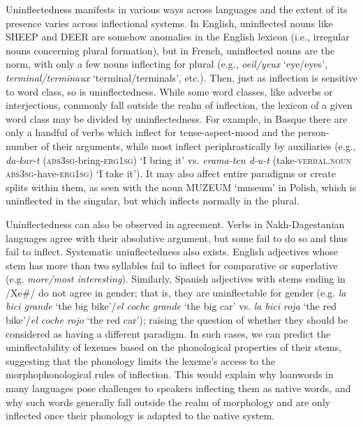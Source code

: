 \documentclass[output=paper]{langscibook}
\begin{document}
Uninflectedness manifests in various ways across languages and the extent of its presence varies across inflectional systems. In English, uninflected nouns like SHEEP and DEER are somehow anomalies in the English lexicon (i.e., irregular nouns concerning plural formation), but in French, uninflected nouns are the norm, with only a few nouns inflecting for plural (e.g., \emph{oeil/yeux} `eye/eyes', \emph{terminal/terminaux} `terminal/terminals', etc.). Then, just as inflection is sensitive to word class, so is uninflectedness. While some word classes, like adverbs or interjections, commonly fall outside the realm of inflection, the lexicon of a given word class may be divided by uninflectedness. For example, in Basque there are only a handful of verbs which inflect for tense-aspect-mood and the person-number of their arguments, while most inflect periphrastically by auxiliaries (e.g., \emph{da-kar-t} (\textsc{abs3sg}-bring-\textsc{erg1sg}) `I bring it' vs. \emph{erama-ten d-u-t} (take\textsc{-verbal.noun} \textsc{abs3sg}-have-\textsc{erg1sg}) `I take it'). It may also affect entire paradigms or create splits within them, as seen with the noun MUZEUM `museum' in Polish, which is uninflected in the singular, but which inflects normally in the plural.

Uninflectedness can also be observed in agreement. Verbs in Nakh-Dagestanian languages agree with their absolutive argument, but some fail to do so and thus fail to inflect. Systematic uninflectedness also exists. English adjectives whose stem has more than two syllables fail to inflect for comparative or superlative (e.g. \emph{more/most interesting}). Similarly, Spanish adjectives with stems ending in /Xe\#/ do not agree in gender; that is, they are uninflectable for gender (e.g. \emph{la bici grande} `the big bike'/\emph{el coche grande} `the big car' vs. \emph{la bici roja} `the red bike'/\emph{el coche rojo} `the
red car'); raising the question of whether they should be considered as having a different paradigm. In such cases, we can predict the uninflectability of lexemes based on the phonological properties of their stems, suggesting that the phonology limits the lexeme's access to the morphophonological rules of inflection. This would explain why loanwords in many languages pose challenges to speakers inflecting them as native words, and why such words generally fall outside the realm of
morphology and are only inflected once their phonology is adapted to the native system.
\end{document}
